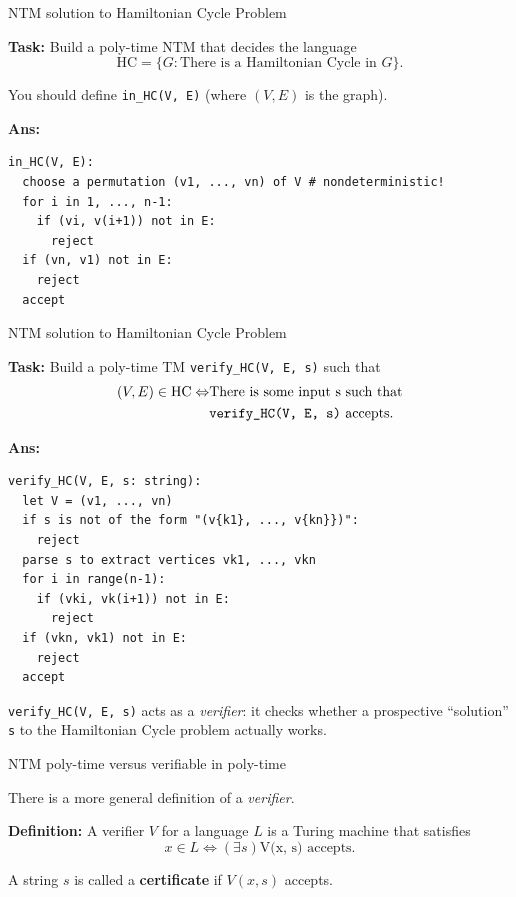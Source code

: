 \documentclass{beamer}
\begin{document}
\begin{frame}[fragile]{NTM solution to Hamiltonian Cycle Problem}

\textbf{Task:} Build a poly-time NTM that decides the language
$$\mathrm{HC} = \{G: \text{There is a Hamiltonian Cycle in $G$}\}.$$

You should define \verb|in_HC(V, E)| (where $(V, E)$ is the graph).

\pause

\textbf{Ans:}
\begin{verbatim}
in_HC(V, E):
  choose a permutation (v1, ..., vn) of V # nondeterministic!
  for i in 1, ..., n-1:
    if (vi, v(i+1)) not in E:
      reject
  if (vn, v1) not in E:
    reject
  accept
\end{verbatim}

\end{frame}

\begin{frame}[fragile]{NTM solution to Hamiltonian Cycle Problem}

\textbf{Task:} Build a poly-time TM \verb|verify_HC(V, E, s)| such that
\begin{align*}
    (V, E) \in \mathrm{HC} \Leftrightarrow &\text{There is some input s such that}\\
    &\text{\texttt{verify\_HC(V, E, s)} accepts}.
\end{align*}

\pause
\vspace{-3mm}
\textbf{Ans:}
\vspace{-3mm}
\begin{verbatim}
verify_HC(V, E, s: string):
  let V = (v1, ..., vn)
  if s is not of the form "(v{k1}, ..., v{kn}})":
    reject
  parse s to extract vertices vk1, ..., vkn
  for i in range(n-1):
    if (vki, vk(i+1)) not in E:
      reject
  if (vkn, vk1) not in E:
    reject
  accept
\end{verbatim}

\pause

\verb|verify_HC(V, E, s)| acts as a \textit{verifier}: it checks whether a prospective ``solution'' \verb|s| to the Hamiltonian Cycle problem actually works.

\end{frame}

\begin{frame}[fragile]{NTM poly-time versus verifiable in poly-time}

There is a more general definition of a \textit{verifier}.

\vspace{2mm}

\textbf{Definition:} A verifier $V$ for a language $L$ is a Turing machine that satisfies
$$x \in L \Leftrightarrow (\exists s) \text{V(x, s) accepts}.$$

A string $s$ is called a \textbf{certificate} if $V(x, s)$ accepts.\\
\end{frame}
\end{document}
